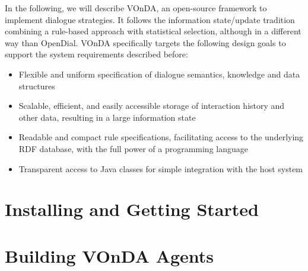 \documentclass[a4paper]{report}
\newcommand{\vonda}{VOnDA\xspace}
\begin{document}
In the following, we will describe \vonda, an open-source framework to
implement dialogue strategies. It follows the information state/update
tradition \citep{traum2003information}
combining a rule-based approach with statistical selection, although in a
different way than OpenDial. \vonda specifically targets the following design
goals to support the system requirements described before:

\begin{itemize}
  \addtolength{\itemsep}{-.6\itemsep}
\item Flexible and uniform specification of dialogue semantics, knowledge and
  data structures
\item Scalable, efficient, and easily accessible storage of interaction history
  and other data, resulting in a large information state
\item Readable and compact rule specifications, facilitating access to the
  underlying RDF database, with the full power of a programming language
\item Transparent access to Java classes for simple integration with the host
  system
\end{itemize}
\fi



%

\chapter{Installing and Getting Started}


\newpage

\newpage


\chapter{Building VOnDA Agents}

\newpage



\end{document}
